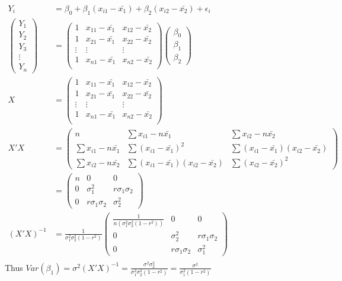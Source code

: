\documentclass[a4paper]{article}
\begin{document}
\begin{align*}
Y_i &= \beta_0+\beta_1(x_{i1}-\bar{x_1}) + \beta_2(x_{i2}-\bar{x_2})+\epsilon_i\\
\begin{pmatrix}Y_1\\Y_2\\Y_3\\\vdots\\Y_n
\end{pmatrix}&= \begin{pmatrix} 1 & x_{11}-\bar{x_1} & x_{12}-\bar{x_2}\\
 1 & x_{21}-\bar{x_1} & x_{22}-\bar{x_2}\\
 \vdots & \vdots & \vdots\\
 1 & x_{n1}-\bar{x_1} & x_{n2}-\bar{x_2}\\
\end{pmatrix}\begin{pmatrix}
\beta_0\\\beta_1\\\beta_2
\end{pmatrix}\\
X &= \begin{pmatrix} 1 & x_{11}-\bar{x_1} & x_{12}-\bar{x_2}\\
 1 & x_{21}-\bar{x_1} & x_{22}-\bar{x_2}\\
 \vdots & \vdots & \vdots\\
 1 & x_{n1}-\bar{x_1} & x_{n2}-\bar{x_2}\\
\end{pmatrix}\\
X'X &= \begin{pmatrix}
n & \sum x_{i1}-n\bar{x_1} & \sum x_{i2} - n \bar{x_2}\\
\sum x_{i1}-n\bar{x_1} & \sum(x_{i1}-\bar{x_1})^2 & \sum (x_{i1}-\bar{x_1})(x_{i2}-\bar{x_2})\\
\sum x_{i2}-n\bar{x_2} & \sum (x_{i1}-\bar{x_1})(x_{i2}-\bar{x_2}) & \sum(x_{i2}-\bar{x_2})^2
\end{pmatrix}\\
& = \begin{pmatrix}
n & 0 & 0\\
0 & \sigma^2_{1} & r\sigma_1\sigma_2\\
0 & r\sigma_1\sigma_2 & \sigma_2^2
\end{pmatrix}\\ 
(X'X)^{-1} & = \frac{1}{\sigma_1^2\sigma_2^2(1-r^2)} \begin{pmatrix}
\frac{1}{n(\sigma_1^2\sigma_2^2(1-r^2))} & 0 & 0\\
0 & \sigma^2_{2} & r\sigma_1\sigma_2\\
0 & r\sigma_1\sigma_2 & \sigma_1^2
\end{pmatrix}\\ 
\end{align*}
Thus $Var(\beta_1) = \sigma^2 (X'X)^{-1} = \frac{\sigma^2 \sigma_2^2}{\sigma_1^2\sigma_2^2(1-r^2)} = \frac{\sigma^2}{\sigma_1^2(1-r^2)}$
\end{document}
